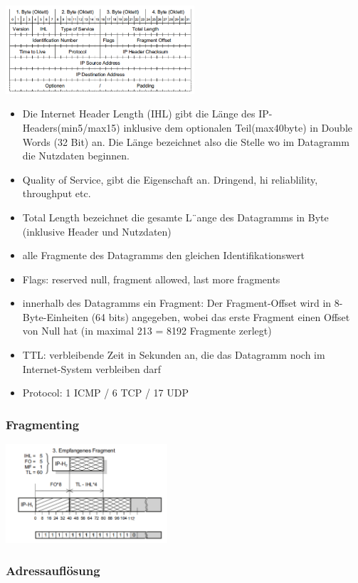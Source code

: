 \includegraphics[width=7cm]{part2/ipheader}
\begin{itemize}
\item Die Internet Header Length (IHL) gibt die Länge des IP-Headers(min5/max15)
inklusive dem optionalen Teil(max40byte) in Double Words (32 Bit)
an. Die Länge bezeichnet also die Stelle wo im Datagramm die Nutzdaten
beginnen.
\item Quality of Service, gibt die Eigenschaft an. Dringend, hi reliablility,
throughput etc.
\item Total Length bezeichnet die gesamte L¨ange des Datagramms in Byte
(inklusive Header und Nutzdaten)
\item alle Fragmente des Datagramms den gleichen Identifikationswert
\item Flags: reserved null, fragment allowed, last more fragments
\item innerhalb des Datagramms ein Fragment: Der Fragment-Offset wird in
8-Byte-Einheiten (64 bits) angegeben, wobei das erste Fragment einen
Offset von Null hat (in maximal 213 = 8192 Fragmente zerlegt)
\item TTL: verbleibende Zeit in Sekunden an, die das Datagramm noch im Internet-System
verbleiben darf
\item Protocol: 1 ICMP / 6 TCP / 17 UDP
\end{itemize}

\subsubsection*{Fragmenting}

\includegraphics[width=6cm]{part2/fragmenting}


\subsubsection*{Adressauflösung}


